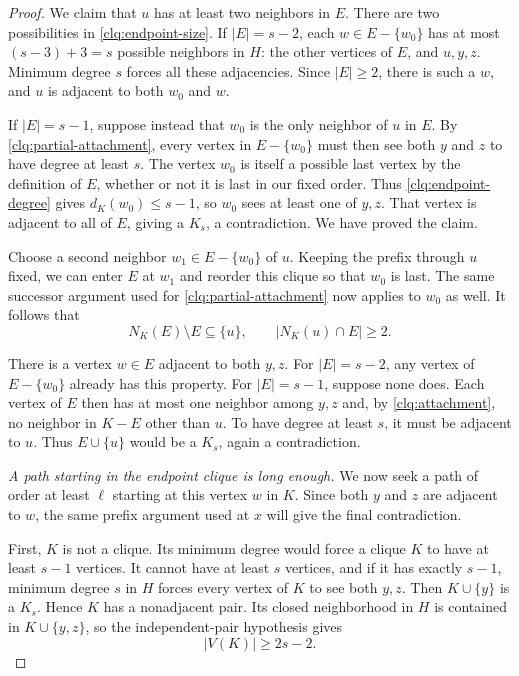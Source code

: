 \begin{proof}
We claim that $u$ has at least two neighbors in $E$.  There are two
possibilities in \eqref{clq:endpoint-size}.
If $|E|=s-2$, each $w\in E-\{w_0\}$ has at most
$(s-3)+3=s$ possible neighbors in $H$: the other vertices of $E$,
and $u,y,z$.  Minimum degree $s$ forces all these adjacencies.
Since $|E|\ge2$, there is such a $w$, and $u$ is adjacent to both
$w_0$ and $w$.

If $|E|=s-1$, suppose instead that $w_0$ is the only neighbor of
$u$ in $E$.  By \eqref{clq:partial-attachment}, every vertex in
$E-\{w_0\}$ must then see both $y$ and $z$ to have degree at
least $s$.  The vertex $w_0$ is itself a possible last vertex by
the definition of $E$, whether or not it is last in our fixed order.
Thus \eqref{clq:endpoint-degree} gives $d_K(w_0)\le s-1$,
so $w_0$ sees at least one of $y,z$.  That vertex is adjacent to
all of $E$, giving a $K_s$, a contradiction.
We have proved the claim.

Choose a second neighbor $w_1\in E-\{w_0\}$ of $u$.
Keeping the prefix through $u$ fixed, we can enter $E$ at $w_1$
and reorder this clique so that $w_0$ is last.  The same successor
argument used for \eqref{clq:partial-attachment} now applies to
$w_0$ as well.  It follows that
\begin{equation}\label{clq:attachment}
 N_K(E)\setminus E\subseteq\{u\},
 \qquad |N_K(u)\cap E|\ge2.
\end{equation}

There is a vertex $w\in E$ adjacent to both $y,z$.
For $|E|=s-2$, any vertex of $E-\{w_0\}$ already has this
property.  For $|E|=s-1$, suppose none does.  Each vertex of $E$
then has at most one neighbor among $y,z$ and, by
\eqref{clq:attachment}, no neighbor in $K-E$ other than $u$.
To have degree at least $s$, it must be adjacent to $u$.
Thus $E\cup\{u\}$ would be a $K_s$, again a contradiction.

\medskip
\noindent\emph{A path starting in the endpoint clique is long enough.}
We now seek a path of order at least $\ell$ starting at this vertex
$w$ in $K$.  Since both $y$ and $z$ are adjacent to $w$, the same
prefix argument used at $x$ will give the final contradiction.

First, $K$ is not a clique.  Its minimum degree would force a clique
$K$ to have at least $s-1$ vertices.  It cannot have at least $s$
vertices, and if it has exactly $s-1$, minimum degree $s$ in $H$
forces every vertex of $K$ to see both $y,z$.  Then
$K\cup\{y\}$ is a $K_s$.  Hence $K$ has a nonadjacent pair.
Its closed neighborhood in $H$ is contained in $K\cup\{y,z\}$,
so the independent-pair hypothesis gives
\begin{equation}\label{clq:component-size}
 |V(K)|\ge 2s-2.
\end{equation}


\end{proof}
